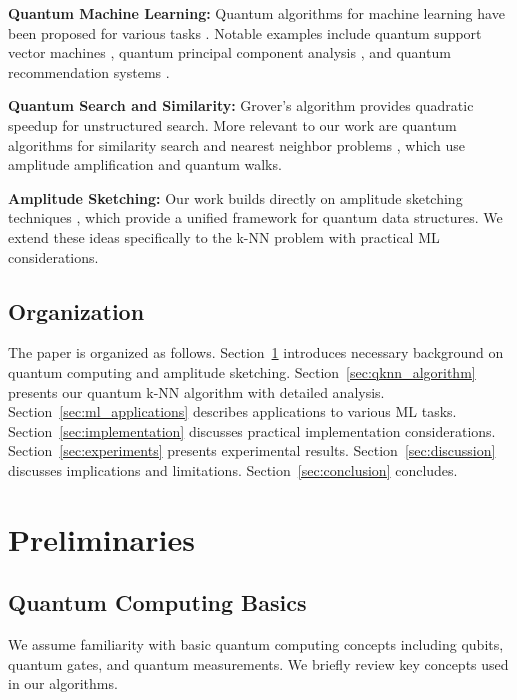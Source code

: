 \documentclass[11pt]{article}
\begin{document}
\textbf{Quantum Machine Learning:} Quantum algorithms for machine learning have been proposed for various tasks \cite{biamonte2017quantum}. Notable examples include quantum support vector machines \cite{rebentrost2014quantum}, quantum principal component analysis \cite{lloyd2014quantum}, and quantum recommendation systems \cite{kerenidis2016quantum}.

\textbf{Quantum Search and Similarity:} Grover's algorithm \cite{grover1996fast} provides quadratic speedup for unstructured search. More relevant to our work are quantum algorithms for similarity search and nearest neighbor problems \cite{wiebe2014quantum,lloyd2013quantum}, which use amplitude amplification and quantum walks.

\textbf{Amplitude Sketching:} Our work builds directly on amplitude sketching techniques \cite{giovannetti2008quantum}, which provide a unified framework for quantum data structures. We extend these ideas specifically to the k-NN problem with practical ML considerations.

\subsection{Organization}

The paper is organized as follows. Section~\ref{sec:preliminaries} introduces necessary background on quantum computing and amplitude sketching. Section~\ref{sec:qknn_algorithm} presents our quantum k-NN algorithm with detailed analysis. Section~\ref{sec:ml_applications} describes applications to various ML tasks. Section~\ref{sec:implementation} discusses practical implementation considerations. Section~\ref{sec:experiments} presents experimental results. Section~\ref{sec:discussion} discusses implications and limitations. Section~\ref{sec:conclusion} concludes.

\section{Preliminaries}
\label{sec:preliminaries}

\subsection{Quantum Computing Basics}

We assume familiarity with basic quantum computing concepts including qubits, quantum gates, and quantum measurements. We briefly review key concepts used in our algorithms.
\end{document}
